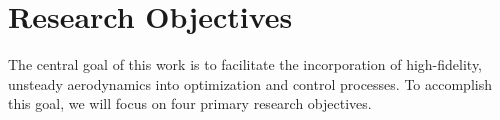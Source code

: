 \documentclass[12pt, letterpaper]{article}
\begin{document}






\section{Research Objectives}

The central goal of this work is to facilitate the incorporation of high-fidelity, unsteady aerodynamics into optimization and control processes.  To accomplish this goal, we will focus on four primary research objectives.
\end{document}
